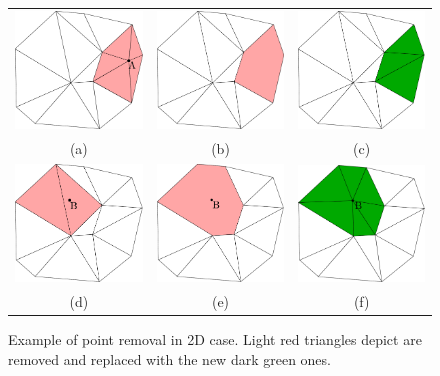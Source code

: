 \begin{figure}[t]
\centering
\begin{tabular}{ccc}
\includegraphics[width=0.28\columnwidth]{./img//delaunayExampleMoving01}&
\includegraphics[width=0.28\columnwidth]{./img//delaunayExampleMoving02}&
\includegraphics[width=0.28\columnwidth]{./img//delaunayExampleMoving03}\\
(a)&(b)&(c)\\
\includegraphics[width=0.28\columnwidth]{./img//delaunayExampleMoving04}&
\includegraphics[width=0.28\columnwidth]{./img//delaunayExampleMoving05}&
\includegraphics[width=0.28\columnwidth]{./img//delaunayExampleMoving06}\\(d)&(e)&(f)
\end{tabular}
\caption{Example of point removal in 2D case. Light red triangles depict are removed and replaced with the new dark green ones.}
\label{fig:moving_ch5}
\end{figure}

